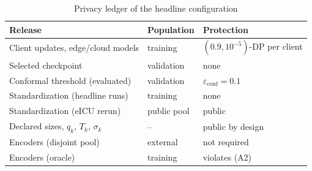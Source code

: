 \begin{table}[!t]
\centering
\caption{Privacy ledger of the headline configuration}
\label{tab:ledger}
\setlength{\tabcolsep}{2.4pt}
\footnotesize
\begin{tabular}{lll}
\toprule
Release & Population & Protection \\
\midrule
Client updates, edge/cloud models & training & $(0.9, 10^{-5})$-DP per client \\
Selected checkpoint               & validation & none \\
Conformal threshold (evaluated)   & validation & $\varepsilon_{\mathrm{conf}} = 0.1$ \\
Standardization (headline runs) & training & none \\
Standardization (eICU rerun) & public pool & public \\
Declared sizes, $q_k$, $T_k$, $\sigma_k$ & -- & public by design \\
Encoders (disjoint pool)          & external & not required \\
Encoders (oracle)                 & training & violates (A2) \\
\bottomrule
\end{tabular}
\end{table}

